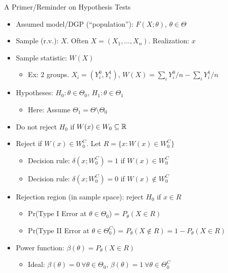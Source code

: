 \begin{frame}{A Primer/Reminder on Hypothesis Tests}
\begin{itemize}
    \item Assumed model/DGP (``population''): $F(X;\theta)$, $\theta\in \Theta$
    \item Sample (r.v.): $X$. Often $X=(X_1,\ldots,X_n)$. Realization: $x$
    \item Sample statistic: $W(X)$
    \begin{itemize}
        \item Ex: 2 groups. $X_i=(Y_i^0,Y_i^1)$, $W(X)=\sum_i Y_i^0/n-\sum_iY_i^1/n$
    \end{itemize}
    \item Hypotheses: $H_0:\theta\in\Theta_0$, $H_1:\theta\in\Theta_1$
    \begin{itemize}
        \item Here: Assume $\Theta_1=\Theta\setminus\Theta_0$
    \end{itemize}
    \item Do not reject $H_0$ if $W(x)\in W_0\subseteq \Bbb{R}$
    \item Reject if $W(x)\in W_0^C$. Let $R=\{x:W(x)\in W_0^C\}$
    \begin{itemize}
        \item Decision rule: $\delta(x;W_0^C)=1$ if $W(x)\in W_0^C$
        \item Decision rule: $\delta(x;W_0^C)=0$ if $W(x)\not\in W_0^C$
    \end{itemize}
    \item Rejection region (in sample space): reject $H_0$ if $x\in R$
    \begin{itemize}
        \item Pr(Type I Error at $\theta\in\Theta_0$) = $P_\theta(X\in R)$
        \item Pr(Type II Error at $\theta\in\Theta_0^C$) = $P_\theta(X\not\in R)=1-P_\theta(X\in R)$
    \end{itemize}
    \item Power function: $\beta(\theta)=P_\theta(X\in R)$
    \begin{itemize}
        \item Ideal: $\beta(\theta)=0\ \forall \theta\in\Theta_0$, $\beta(\theta)=1\ \forall\theta\in\Theta_0^C$
    \end{itemize}
\end{itemize}
\end{frame}

